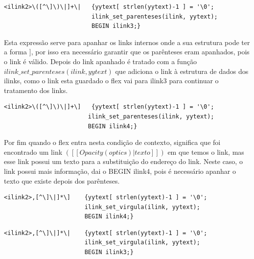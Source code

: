 \documentclass[11pt, a4paper, oneside]{article}
\begin{document}
\begin{verbatim}
<ilink2>\([^\]\)\|]+\|   {yytext[ strlen(yytext)-1 ] = '\0';
                         ilink_set_parenteses(ilink, yytext);
                         BEGIN ilink3;}
\end{verbatim}

Esta expressão serve para apanhar os links internos onde a sua estrutura pode ter a forma \begin{math}[[Opacity ((optics|]]\end{math}, por isso era necessário garantir que os parênteses eram apanhados, pois o link é válido. 
Depois do link apanhado é tratado com a função \begin{math} ilink\_set\_parenteses(ilink, yytext)\end{math} que adiciona o link à estrutura de dados dos ilinks, como o link esta guardado o flex vai para ilink3 para continuar o tratamento dos links.

\begin{verbatim}
<ilink2>\([^\]\)\|]+\]   {yytext[ strlen(yytext)-1 ] = '\0';
                        ilink_set_parenteses(ilink, yytext);
                        BEGIN ilink4;}
\end{verbatim}
Por fim quando o flex entra nesta condição de contexto, significa que foi encontrado um link \begin{math}([[Opacity (optics)|texto]])\end{math} em que temos o link, mas esse link possui um texto para a substituição do endereço do link.
Neste caso, o link possui mais informação, dai o BEGIN ilink4, pois é necessário apanhar o texto que existe depois dos parênteses.

\begin{verbatim}
<ilink2>,[^\]\|]*\]    {yytext[ strlen(yytext)-1 ] = '\0';
                       ilink_set_virgula(ilink, yytext);
                       BEGIN ilink4;}
\end{verbatim}

\begin{verbatim}
<ilink2>,[^\]\|]*\|    {yytext[ strlen(yytext)-1 ] = '\0';
                       ilink_set_virgula(ilink, yytext);
                       BEGIN ilink3;}
\end{verbatim}
\end{document}
